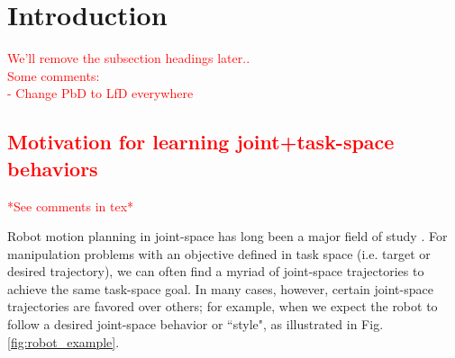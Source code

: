 \documentclass[letterpaper, 10 pt, conference,fleqn]{ieeeconf}
\begin{document}



\IEEEpeerreviewmaketitle
\section{Introduction}
\label{sec:intro}
\textcolor{red}{We'll remove the subsection headings later..\\ Some comments:\\- Change PbD to LfD everywhere}
\subsection{\textcolor{red}{Motivation for learning joint+task-space behaviors}}
\textcolor{red}{*See comments in tex*}
%
%
%

Robot motion planning in joint-space has long been a major field of study \cite{kelly2006control}. For manipulation problems with an objective defined in task space (i.e. target or desired trajectory), we can often find a myriad of joint-space trajectories to achieve the same task-space goal. In many cases, however, certain joint-space trajectories are favored over others; for example, when we expect the robot to follow a desired joint-space behavior or ``style", as illustrated in Fig. \ref{fig:robot_example}. 
\end{document}
